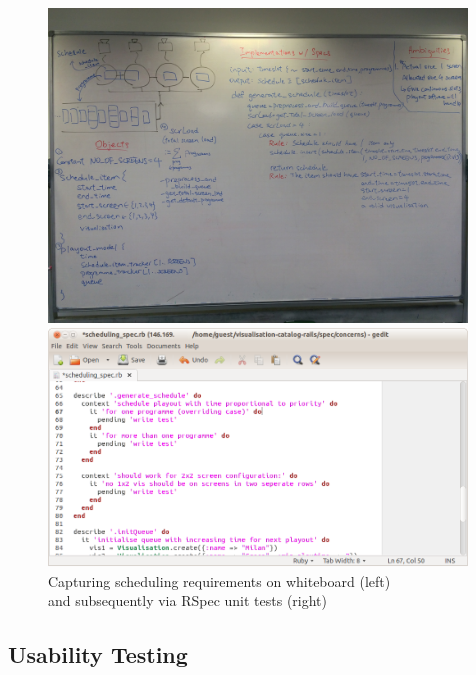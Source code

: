 \documentclass[a4paper]{article}
\begin{document}
\begin{figure}[H]
  \begin{minipage}{0.46\textwidth}
      \includegraphics[width = 0.99\textwidth, trim = 0 4.5cm 0 7cm, clip]{./evaluation/scheduling_whiteboard.jpg}
  \end{minipage}
  \begin{minipage}{0.53\textwidth}
      \includegraphics[width = 0.99\textwidth]{./evaluation/scheduling_spec.png}
  \end{minipage}
  \caption{Capturing scheduling requirements on whiteboard (left)\\ and subsequently via RSpec unit tests (right)}
 
\end{figure}


\subsection{Usability Testing}
\end{document}
